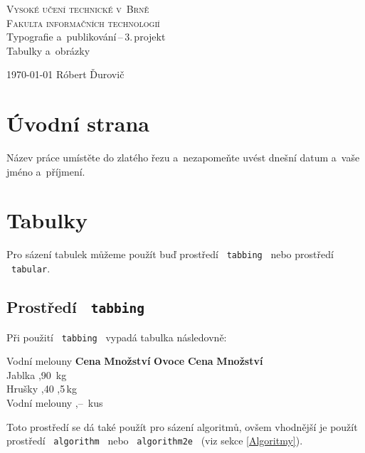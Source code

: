 \documentclass[a4paper,11pt, titlepage]{article}
\begin{document}
\begin{titlepage}

\begin{center}
    {\Huge\textsc{Vysoké učení technické v~Brně}}\\
        \medskip
    {\huge\textsc{Fakulta informačních technologií}}\\
    {\LARGE Typografie a~publikování\,--\,3.\,projekt}\\
        \medskip
    {\Huge Tabulky a~obrázky}\\
\end{center}

{\LARGE \today \hfill
Róbert Ďurovič}

\end{titlepage}


\section{Úvodní strana}
Název práce umístěte do zlatého řezu a~nezapomeňte uvést dnešní datum a~vaše jméno a~příjmení.

\section{Tabulky}
Pro sázení tabulek můžeme použít buď prostředí \ \texttt{tabbing} \ nebo prostředí \ \texttt{tabular}.

\subsection{Prostředí \ \texttt{tabbing}}
Při použití \ \texttt{tabbing} \ vypadá tabulka následovně:

\begin{tabbing}
Vodní melouny \quad\= \textbf{Cena} \quad\= \textbf{Množství} \kill
\textbf{Ovoce} \> \textbf{Cena} \> \textbf{Množství}\\
Jablka ,90 \,kg\\
Hrušky ,40 ,5\,kg\\
Vodní melouny ,-- \,kus
\end{tabbing}

\bigskip

\noindent
Toto prostředí se dá také použít pro sázení algoritmů, ovšem vhodnější je použít
prostředí \ \texttt{algorithm} \ nebo \ \texttt{algorithm2e} \ (viz sekce \ref{Algoritmy}).
\end{document}
